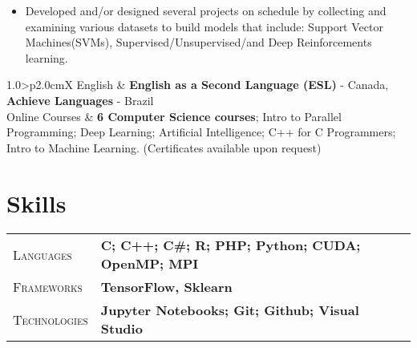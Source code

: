 \documentclass[9pt, a4paper, oneside, final]{scrartcl} %
\newcommand{\gray}{\rowcolor[gray]{.90}} %
\begin{document}
\begin{itemize}
\item Developed and/or designed several projects on schedule by collecting and examining various datasets to build models that include: Support Vector Machines(SVMs), Supervised/Unsupervised/and Deep Reinforcements learning.
\end{itemize}

\begin{center}
\begin{tabularx}{1.0\linewidth}{>{\raggedleft\scshape}p{2.0cm}X}
\gray English & \textbf{English as a Second Language (ESL)} - Canada, 
          \textbf{Achieve Languages} - Brazil\\
\gray Online Courses & \textbf{6 Computer Science courses}; Intro to Parallel Programming; Deep Learning; Artificial Intelligence; C++ for C Programmers; Intro to Machine Learning. (Certificates available upon request)
\end{tabularx}
\end{center}


\section{Skills}

\begin{center}
\begin{tabularx}{1.0\linewidth}{>{\raggedleft\scshape}p{2.2cm}X}
\gray Languages & \textbf{C; C++; C\#; R; PHP; Python; CUDA; OpenMP; MPI}\\ %
\gray Frameworks & \textbf{TensorFlow, Sklearn}\\ %
\gray Technologies & \textbf{Jupyter Notebooks; Git; Github; Visual Studio}\\
\end{tabularx}
\end{center}


%
\end{document}
